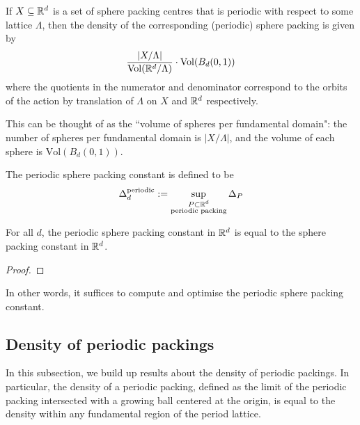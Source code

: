 \begin{lemma}\label{SpherePacking.density of periodic packing}\notready
  If $X \subseteq \mathbb{R}^d$ is a set of sphere packing centres that is periodic with respect to some lattice $\Lambda$, then the density of the corresponding (periodic) sphere packing is given by
  $$ \frac{\lvert {X/\Lambda} \rvert}{\mathrm{Vol}(\mathbb{R}^d / \Lambda)} \cdot \mathrm{Vol}(B_d(0,1))$$
  where the quotients in the numerator and denominator correspond to the orbits of the action by translation of $\Lambda$ on $X$ and $\mathbb{R}^d$ respectively.
\end{lemma}
\begin{remark}
  This can be thought of as the ``volume of spheres per fundamental domain": the number of spheres per fundamental domain is $\lvert {X/\Lambda} \rvert$, and the volume of each sphere is $\mathrm{Vol}(B_d(0,1))$.
\end{remark}

\begin{definition}\label{def-Periodic-sphere-packing-constant}\notready
    The periodic sphere packing constant is defined to be
    $$ \Delta_{d}^{\text{periodic}} := \sup_{\substack{P \subset \mathbb{R}^d \\ \text{periodic packing}}} \Delta_P$$
\end{definition}

\begin{theorem}\label{periodic-packing-optimal}\notready
    For all $d$, the periodic sphere packing constant in $\mathbb{R}^d$ is equal to the sphere packing constant in $\mathbb{R}^d$.
\end{theorem}
\begin{proof}
\end{proof}

In other words, it suffices to compute and optimise the periodic sphere packing constant.

\subsection{Density of periodic packings}

In this subsection, we build up results about the density of periodic packings. In particular, the density of a periodic packing, defined as the limit of the periodic packing intersected with a growing ball centered at the origin, is equal to the density within any fundamental region of the period lattice.

